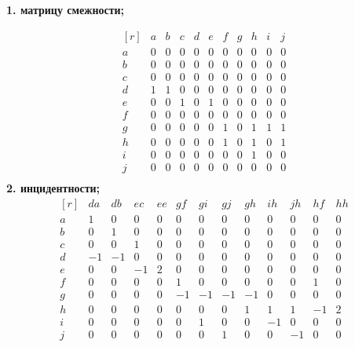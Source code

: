 \documentclass{article}
\begin{document}
\Large{\textbf{1. матрицу смежности;}}

\[
\begin{matrix*}[r]
  & a & b & c & d & e & f & g & h & i & j\\
a & 0 & 0 & 0 & 0 & 0 & 0 & 0 & 0 & 0 & 0\\
b & 0 & 0 & 0 & 0 & 0 & 0 & 0 & 0 & 0 & 0\\
c & 0 & 0 & 0 & 0 & 0 & 0 & 0 & 0 & 0 & 0\\
d & 1 & 1 & 0 & 0 & 0 & 0 & 0 & 0 & 0 & 0\\
e & 0 & 0 & 1 & 0 & 1 & 0 & 0 & 0 & 0 & 0\\
f & 0 & 0 & 0 & 0 & 0 & 0 & 0 & 0 & 0 & 0\\
g & 0 & 0 & 0 & 0 & 0 & 1 & 0 & 1 & 1 & 1\\
h & 0 & 0 & 0 & 0 & 0 & 1 & 0 & 1 & 0 & 1\\
i & 0 & 0 & 0 & 0 & 0 & 0 & 0 & 1 & 0 & 0\\
j & 0 & 0 & 0 & 0 & 0 & 0 & 0 & 0 & 0 & 0\\
\end{matrix*} 
\]
\newline
\Large{\textbf{2. инцидентности;}}\\
\[
\begin{matrix*}[r]
   & da & db & ec & ee & gf & gi & gj & gh & ih & jh & hf & hh\\
a &  1 &  0 &  0 &  0 &  0 &  0 &  0 &  0 &  0 &  0 &  0 &  0\\
b &  0 &  1 &  0 &  0 &  0 &  0 &  0 &  0 &  0 &  0 &  0 &  0\\
c &  0 &  0 &  1 &  0 &  0 &  0 &  0 &  0 &  0 &  0 &  0 &  0\\
d & -1 & -1 &  0 &  0 &  0 &  0 &  0 &  0 &  0 &  0 &  0 &  0\\
e &  0 &  0 & -1 &  2 &  0 &  0 &  0 &  0 &  0 &  0 &  0 &  0\\
f &  0 &  0 &  0 &  0 &  1 &  0 &  0 &  0 &  0 &  0 &  1 &  0\\
g &  0 &  0 &  0 &  0 & -1 & -1 & -1 & -1 &  0 &  0 &  0 &  0\\
h &  0 &  0 &  0 &  0 &  0 &  0 &  0 &  1 &  1 &  1 & -1 &  2\\
i &  0 &  0 &  0 &  0 &  0 &  1 &  0 &  0 & -1 &  0 &  0 &  0\\
j &  0 &  0 &  0 &  0 &  0 &  0 &  1 &  0 &  0 & -1 &  0 &  0\\
\end{matrix*}
\]
\\\\
\end{document}
